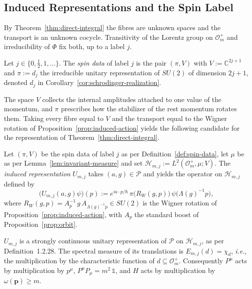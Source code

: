 \subsection{Induced Representations and the Spin Label}
\label{subsec:induced-spin}

By Theorem~\ref{thm:direct-integral} the fibres are unknown spaces and the transport is an unknown cocycle. Transitivity of the Lorentz group on $\mathcal{O}_m^+$ and irreducibility of $\Phi$ fix both, up to a label $j$.

\begin{definition}\label{def:spin-data}
	Let $j\in\{0,\tfrac12,1,\dots\}$. The \emph{spin data} of label $j$ is the pair $(\pi,V)$ with $V:=\mathbb{C}^{2j+1}$ and $\pi:=d_j$ the irreducible unitary representation of $SU(2)$ of dimension $2j+1$, denoted $d_j$ in Corollary~\ref{cor:schrodinger-realization}.
\end{definition}

\noindent The space $V$ collects the internal amplitudes attached to one value of the momentum, and $\pi$ prescribes how the stabilizer of the rest momentum rotates them. Taking every fibre equal to $V$ and the transport equal to the Wigner rotation of Proposition~\ref{prop:induced-action} yields the following candidate for the representation of Theorem~\ref{thm:direct-integral}.

\begin{definition}\label{def:induced-rep}
	Let $(\pi,V)$ be the spin data of label $j$ as per Definition~\ref{def:spin-data}, let $\mu$ be as per Lemma~\ref{lem:invariant-measure} and set $\mathcal{H}_{m,j}:=L^2(\mathcal{O}_m^+,\mu;V)$. The \emph{induced representation} $U_{m,j}$ takes $(a,g)\in\mathcal{P}$ and yields the operator on $\mathcal{H}_{m,j}$ defined by
	\begin{equation}\label{eq:induced-rep}
		\big(U_{m,j}(a,g)\psi\big)(p):=e^{ia\cdot p/\hbar}\,\pi\big(R_W(g,p)\big)\,\psi\big(\Lambda(g)^{-1}p\big),
	\end{equation}
	where $R_W(g,p)=A_p^{-1}\,g\,A_{\Lambda(g)^{-1}p}\in SU(2)$ is the Wigner rotation of Proposition~\ref{prop:induced-action}, with $A_p$ the standard boost of Proposition~\ref{prop:orbit}.
\end{definition}

\begin{proposition}\label{prop:induced-unitary}
	$U_{m,j}$ is a strongly continuous unitary representation of $\mathcal{P}$ on $\mathcal{H}_{m,j}$, as per Definition~1.2.28. The spectral measure of its translations is $E_{m,j}(d)=\chi_d$, \textit{i.e.}, the multiplication by the characteristic function of $d\subseteq\mathcal{O}_m^+$. Consequently $P^\mu$ acts by multiplication by $p^\mu$, $P^\mu P_\mu=m^2\,\mathbb{1}$, and $H$ acts by multiplication by $\omega(\mathbf{p})\geq m$.
\end{proposition}

